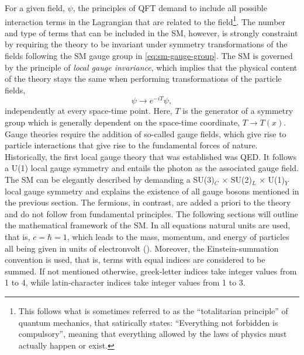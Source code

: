 For a given field, $\psi$, the principles of QFT demand to include all possible interaction terms in the Lagrangian that are related to the field\footnote{This follows what is sometimes referred to as the ``totalitarian principle'' of quantum mechanics, that satirically states: ``Everything not forbidden is compulsory'', meaning that everything allowed by the laws of physics must actually happen or exist.}.
The number and type of terms that can be included in the SM, however, is strongly constraint by requiring the theory to be invariant under symmetry transformations of the fields following the SM gauge group in \cref{eq:sm-gauge-group}.
The SM is governed by the principle of \emph{local gauge invariance}, which implies that the physical content of the theory stays the same when performing transformations of the particle fields,
\begin{equation}
  \psi \rightarrow e^{-iT} \psi,
\end{equation}
independently at every space-time point. Here, $T$ is the generator of a symmetry group which is generally dependent on the space-time coordinate, $T \rightarrow T(x)$. 
Gauge theories require the addition of so-called gauge fields, which give rise to particle interactions that give rise to the fundamental forces of nature. 
Historically, the first local gauge theory that was established was QED. It follows a U(1) local gauge symmetry and entails the photon as the associated gauge field. 
The SM can be elegantly described by demanding a SU(3)$_C$ $\times$ SU(2)$_L$ $\times$ U(1)$_Y$ local gauge symmetry and explains the existence of all gauge bosons mentioned in the previous section. 
The fermions, in contrast, are added a priori to the theory and do not follow from fundamental principles.
The following sections will outline the mathematical framework of the SM.
In all equations natural units are used, that is, $c = \hbar = 1$, which leads to the mass, momentum, and energy of particles all being given in units of electronvolt (\eV).
Moreover, the Einstein-summation convention is used, that is, terms with equal indices are considered to be summed. If not mentioned otherwise, greek-letter indices take integer values from 1 to 4, while latin-character indices take integer values from 1 to 3.

